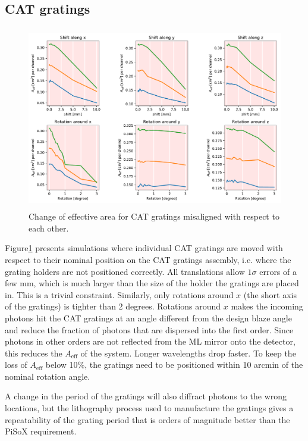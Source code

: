 \documentclass[]{spie}  %
\begin{document}
\subsection{CAT gratings}
\begin{figure} [ht]
  \begin{center}
    \includegraphics[height=8cm]{CAT_individual.pdf}
  \end{center}
  \caption
      { \label{fig:CAT_individual}Change of effective area for CAT gratings misaligned with respect to each other.
}
\end{figure}

Figure\ref{fig:CAT_individual} presents simulations where individual
CAT gratings are moved with respect to their nominal position on the
CAT gratings assembly, i.e. where the grating holders are not
positioned correctly. All translations allow $1\sigma$ errors of a few
mm, which is much larger than the size of the holder the gratings are
placed in. This is a trivial constraint. Similarly, only rotations
around $x$ (the short axis of the gratings) is tighter than 2
degrees. Rotations around $x$ makes the incoming photons hit the CAT
gratings at an angle different from the design blaze angle and reduce
the fraction of photons that are dispersed into the first order. Since
photons in other orders are not reflected from the ML mirror onto the
detector, this reduces the $A_{\mathrm{eff}}$ of the system. Longer
wavelengths drop faster. To keep the loss of $A_{\mathrm{eff}}$ below
10\%, the gratings need to be positioned within 10 arcmin of the
nominal rotation angle.

A change in the period of the gratings will also diffract photons to
the wrong locations, but the lithography process used to manufacture
the gratings gives a repeatability of the grating period that is
orders of magnitude better than the PiSoX requirement.
\end{document}
